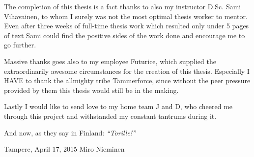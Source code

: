 The completion of this thesis is a fact thanks to also my instructor D.Sc. Sami Vihavainen, to whom I surely was not the most optimal thesis worker to mentor. Even after three weeks of full-time thesis work which resulted only under 5 pages of text Sami could find the positive sides of the work done and encourage me to go further.

Massive thanks goes also to my employee Futurice, which supplied the extraordinarily awesome circumstances for the creation of this thesis. Especially I HAVE to thank the allmighty tribe Tammerforce, since without the peer pressure provided by them this thesis would still be in the making. 

Lastly I would like to send love to my home team J and D, who cheered me through this project and withstanded my constant tantrums during it.

And now, as they say in Finland: \textit{``Torille!''}


\bigskip

\noindent 
Tampere, April 17, 2015
\noindent 
Miro Nieminen







\newpage
\tableofcontents










\newpage
\renewcommand{\chaptermark}[1]{\markboth{\thechapter. \ #1}{}}
\renewcommand{\sectionmark}[1]{\markright{}{}}
\lhead{\fancyplain{}{\leftmark}}
 
